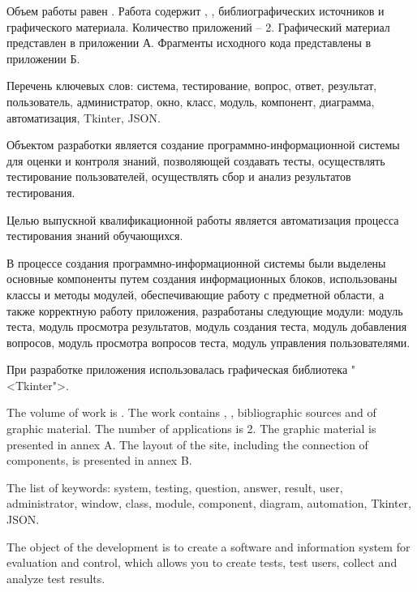 
Объем работы равен . Работа содержит , ,  библиографических источников и  графического материала. Количество приложений – 2. Графический материал представлен в приложении А. Фрагменты исходного кода представлены в приложении Б.

Перечень ключевых слов: система, тестирование, вопрос, ответ, результат, пользователь, администратор, окно, класс, модуль, компонент, диаграмма, автоматизация, Tkinter, JSON.

Объектом разработки является создание программно-информационной системы для оценки и контроля знаний, позволяющей создавать тесты, осуществлять тестирование пользователей, осуществлять сбор и анализ результатов тестирования.

Целью выпускной квалификационной работы является автоматизация процесса тестирования знаний обучающихся.

В процессе создания программно-информационной системы были выделены основные компоненты путем создания информационных блоков, использованы классы и методы модулей, обеспечивающие работу с предметной области, а также корректную работу приложения, разработаны следующие модули: модуль теста, модуль просмотра результатов, модуль создания теста, модуль добавления вопросов, модуль просмотра вопросов теста, модуль управления пользователями.

При разработке приложения использовалась графическая библиотека "<Tkinter">.

  
The volume of work is . The work contains , ,  bibliographic sources and  of graphic material. The number of applications is 2. The graphic material is presented in annex A. The layout of the site, including the connection of components, is presented in annex B.

The list of keywords: system, testing, question, answer, result, user, administrator, window, class, module, component, diagram, automation, Tkinter, JSON.

The object of the development is to create a software and information system for evaluation and control, which allows you to create tests, test users, collect and analyze test results.

